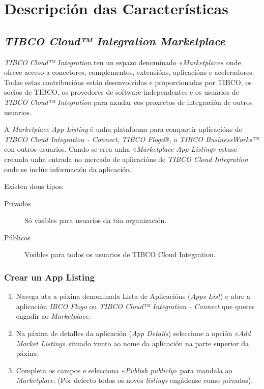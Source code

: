 \chapter{Descripción das Características}
\label{chap:DescripciónDasCaracteristicas}

\section{\textit{TIBCO Cloud™ Integration Marketplace}}

\textit{TIBCO Cloud™ Integration} ten un espazo denominado «\textit{Marketplace}» onde ofrece acceso a conectores, complementos, extensións, aplicacións e aceleradores. Todas estas contribucións están desenvolvidas e proporcionadas por TIBCO, os socios de TIBCO, os provedores de software independentes e os usuarios de \textit{TIBCO Cloud™ Integration} para axudar cos proxectos de integración de outros usuarios.

A \textit{Marketplace App Listing} é unha plataforma para compartir aplicacións de \textit{TIBCO Cloud Integration - Connect}, \textit{TIBCO Flogo®}, o \textit{TIBCO BusinessWorks™} con outros usuarios. Cando se crea unha «\textit{Marketplace App Listing}» estase creando unha entrada no mercado de aplicacións de \textit{TIBCO Cloud Integration} onde se inclúe información da aplicación.

Existen dous tipos:

\begin{description}
    \item[Privados] Só visibles para usuarios da túa organización.
    \item[Públicos] Visibles para todos os usuarios de TIBCO Cloud Integration.
\end{description}

\subsection{Crear un App Listing}

\begin{enumerate}
	\item Navega ata a páxina denominada Lista de Aplicacións (\textit{Apps List}) e abre a aplicación  \textit{IBCO Flogo} ou \textit{TIBCO Cloud™ Integration - Connect} que queres engadir ao \textit{Marketplace}.
	
	\item Na páxina de detalles da aplicación (\textit{App Details}) seleccione a opción «\textit{Add Market Listing}» situado xunto ao nome da aplicación na parte superior da páxina.
	
	\item Completa os campos e selecciona «\textit{Publish publicly}» para mandala ao \textit{Marketplace}. (Por defecto todos os novos \textit{listings} engádense como privados).
\end{enumerate}

